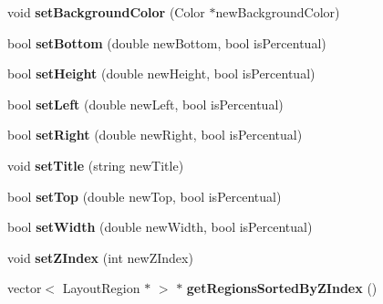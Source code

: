 \begin{CompactItemize}
\item 
void \textbf{setBackgroundColor} (Color $\ast$newBackgroundColor)\label{classbr_1_1pucrio_1_1telemidia_1_1ginga_1_1ncl_1_1model_1_1presentation_1_1FormatterDeviceRegion_671eeded58506be21405fac91db803d0}

\item 
bool \textbf{setBottom} (double newBottom, bool isPercentual)\label{classbr_1_1pucrio_1_1telemidia_1_1ginga_1_1ncl_1_1model_1_1presentation_1_1FormatterDeviceRegion_24c82a8adf3e11fcc8448e8e1be58024}

\item 
bool \textbf{setHeight} (double newHeight, bool isPercentual)\label{classbr_1_1pucrio_1_1telemidia_1_1ginga_1_1ncl_1_1model_1_1presentation_1_1FormatterDeviceRegion_09ae9415ea01f6a2e8513a1239662a86}

\item 
bool \textbf{setLeft} (double newLeft, bool isPercentual)\label{classbr_1_1pucrio_1_1telemidia_1_1ginga_1_1ncl_1_1model_1_1presentation_1_1FormatterDeviceRegion_ebba0125d183368cc51b6e733ef3a4de}

\item 
bool \textbf{setRight} (double newRight, bool isPercentual)\label{classbr_1_1pucrio_1_1telemidia_1_1ginga_1_1ncl_1_1model_1_1presentation_1_1FormatterDeviceRegion_a29cd6d8d02abac0cebc5458f713f180}

\item 
void \textbf{setTitle} (string newTitle)\label{classbr_1_1pucrio_1_1telemidia_1_1ginga_1_1ncl_1_1model_1_1presentation_1_1FormatterDeviceRegion_67f105cb67af22f73feb1178f8d869e2}

\item 
bool \textbf{setTop} (double newTop, bool isPercentual)\label{classbr_1_1pucrio_1_1telemidia_1_1ginga_1_1ncl_1_1model_1_1presentation_1_1FormatterDeviceRegion_2de3a3c8c01e5352295a3c11189f33f7}

\item 
bool \textbf{setWidth} (double newWidth, bool isPercentual)\label{classbr_1_1pucrio_1_1telemidia_1_1ginga_1_1ncl_1_1model_1_1presentation_1_1FormatterDeviceRegion_8e5581e14ca35732fc859cf15cfbd1d2}

\item 
void \textbf{setZIndex} (int newZIndex)\label{classbr_1_1pucrio_1_1telemidia_1_1ginga_1_1ncl_1_1model_1_1presentation_1_1FormatterDeviceRegion_c80c8774bbc0d4e1a442f196c2a1c75a}

\item 
vector$<$ LayoutRegion $\ast$ $>$ $\ast$ \textbf{getRegionsSortedByZIndex} ()\label{classbr_1_1pucrio_1_1telemidia_1_1ginga_1_1ncl_1_1model_1_1presentation_1_1FormatterDeviceRegion_8b8b9478a5a1c86fab2d1b2bd36a08af}


\end{CompactItemize}
